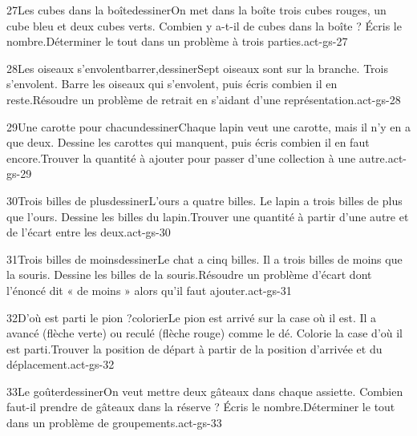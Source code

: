 \begin{activite}{27}{Les cubes dans la boîte}{dessiner}{On met dans la boîte trois cubes rouges, un cube bleu et deux cubes verts. Combien y a-t-il de cubes dans la boîte ? {\otBold\color{otNavy}Écris} le nombre.}{Déterminer le tout dans un problème à trois parties.}{act-gs-27}
\end{activite}
\begin{activite}{28}{Les oiseaux s’envolent}{barrer,dessiner}{Sept oiseaux sont sur la branche. Trois s’envolent. {\otBold\color{otNavy}Barre} les oiseaux qui s’envolent, puis écris combien il en reste.}{Résoudre un problème de retrait en s’aidant d’une représentation.}{act-gs-28}
\end{activite}
\begin{activite}{29}{Une carotte pour chacun}{dessiner}{Chaque lapin veut une carotte, mais il n’y en a que deux. {\otBold\color{otNavy}Dessine} les carottes qui manquent, puis écris combien il en faut encore.}{Trouver la quantité à ajouter pour passer d’une collection à une autre.}{act-gs-29}
\end{activite}
\begin{activite}{30}{Trois billes de plus}{dessiner}{L’ours a quatre billes. Le lapin a {\otBold\color{otNavy}trois billes de plus} que l’ours. Dessine les billes du lapin.}{Trouver une quantité à partir d’une autre et de l’écart entre les deux.}{act-gs-30}
\end{activite}
\begin{activite}{31}{Trois billes de moins}{dessiner}{Le chat a cinq billes. Il a {\otBold\color{otNavy}trois billes de moins} que la souris. Dessine les billes de la souris.}{Résoudre un problème d’écart dont l’énoncé dit « de moins » alors qu’il faut ajouter.}{act-gs-31}
\end{activite}
\begin{activite}{32}{D’où est parti le pion ?}{colorier}{Le pion est arrivé sur la case où il est. Il a avancé (flèche verte) ou reculé (flèche rouge) comme le dé. Colorie la case d’où il est {\otBold\color{otNavy}parti}.}{Trouver la position de départ à partir de la position d’arrivée et du déplacement.}{act-gs-32}
\end{activite}
\begin{activite}{33}{Le goûter}{dessiner}{On veut mettre {\otBold\color{otNavy}deux} gâteaux dans chaque assiette. Combien faut-il prendre de gâteaux dans la réserve ? Écris le nombre.}{Déterminer le tout dans un problème de groupements.}{act-gs-33}
\end{activite}
